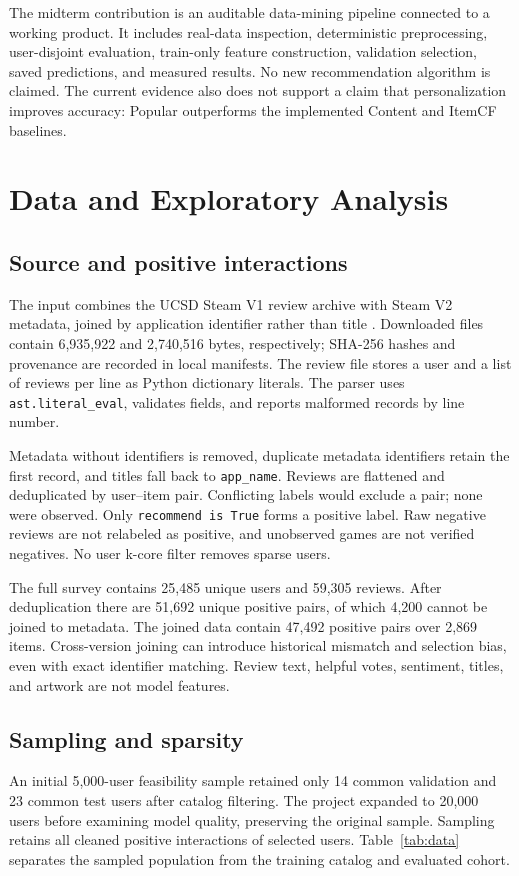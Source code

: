 \documentclass[conference,a4paper]{IEEEtran}
\begin{document}
The midterm contribution is an auditable data-mining pipeline connected to a working product. It includes real-data inspection, deterministic preprocessing, user-disjoint evaluation, train-only feature construction, validation selection, saved predictions, and measured results. No new recommendation algorithm is claimed. The current evidence also does not support a claim that personalization improves accuracy: Popular outperforms the implemented Content and ItemCF baselines.

\section{Data and Exploratory Analysis}
\subsection{Source and positive interactions}
The input combines the UCSD Steam V1 review archive with Steam V2 metadata, joined by application identifier rather than title \cite{ucsd}. Downloaded files contain 6,935,922 and 2,740,516 bytes, respectively; SHA-256 hashes and provenance are recorded in local manifests. The review file stores a user and a list of reviews per line as Python dictionary literals. The parser uses \texttt{ast.literal\_eval}, validates fields, and reports malformed records by line number.

Metadata without identifiers is removed, duplicate metadata identifiers retain the first record, and titles fall back to \texttt{app\_name}. Reviews are flattened and deduplicated by user--item pair. Conflicting labels would exclude a pair; none were observed. Only \texttt{recommend is True} forms a positive label. Raw negative reviews are not relabeled as positive, and unobserved games are not verified negatives. No user k-core filter removes sparse users.

The full survey contains 25,485 unique users and 59,305 reviews. After deduplication there are 51,692 unique positive pairs, of which 4,200 cannot be joined to metadata. The joined data contain 47,492 positive pairs over 2,869 items. Cross-version joining can introduce historical mismatch and selection bias, even with exact identifier matching. Review text, helpful votes, sentiment, titles, and artwork are not model features.

\subsection{Sampling and sparsity}
An initial 5,000-user feasibility sample retained only 14 common validation and 23 common test users after catalog filtering. The project expanded to 20,000 users before examining model quality, preserving the original sample. Sampling retains all cleaned positive interactions of selected users. Table~\ref{tab:data} separates the sampled population from the training catalog and evaluated cohort.
\end{document}

